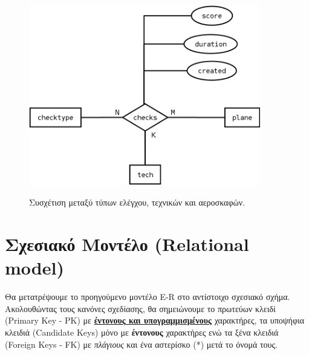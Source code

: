 \documentclass[a4paper]{article}
\begin{document}
\begin{figure}[h]
\centering
\includegraphics[width=0.9\textwidth]{../../ER_model/aviation_relations_2.png}\\
\caption{Συσχέτιση μεταξύ τύπων ελέγχου, τεχνικών και αεροσκαφών.}
\end{figure}
\pagebreak

\section{Σχεσιακό Μοντέλο  (Relational model)}
Θα μετατρέψουμε το προηγούμενο μοντέλο E-R στο αντίστοιχο σχεσιακό σχήμα.
Ακολουθώντας τους κανόνες σχεδίασης, θα σημειώνουμε το πρωτεύων κλειδί
(Primary Key - PK) με  \underline{ \textbf{έντονους και υπογραμμισμένους}} χαρακτήρες,
τα υποψήφια κλειδιά (Candidate Keys) μόνο με \textbf{έντονους}
χαρακτήρες ενώ τα ξένα κλειδιά (Foreign Keys - FK) με \textit{πλάγιους} και ένα αστερίσκο (*) μετά
το όνομά τους.\\
\end{document}
